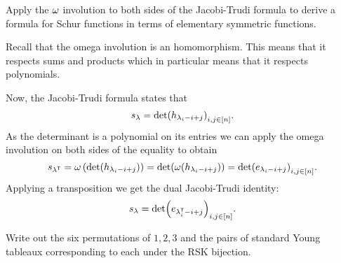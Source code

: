 \documentclass[12pt]{memoir}
\begin{document}
\begin{Ej}[Exercise 2]
    Apply the $\omega$ involution to both sides of the Jacobi-Trudi formula to derive a formula
for Schur functions in terms of elementary symmetric functions.
\end{Ej}

\begin{ptcbr}
    Recall that the omega involution is an homomorphism. This means that it respects sums and products which in particular means that it respects polynomials.\par 
    Now, the Jacobi-Trudi formula states that 
    $$s_\lambda=\det(h_{\lambda_i-i+j})_{i,j\in[n]}.$$
    As the determinant is a polynomial on its entries we can apply the omega involution on both sides of the equality to obtain 
    $$s_{\lambda^{\mathsf{T}}}=\omega\left(\det(h_{\lambda_i-i+j})\right)=\det(\omega(h_{\lambda_i-i+j}))=\det(e_{\lambda_i-i+j})_{i,j\in[n]}.$$
    Applying a transposition we get the dual Jacobi-Trudi identity:
    $$s_{\lambda}=\det(e_{\lambda^{\mathsf{T}}_i-i+j})_{i,j\in[n]}.$$
\end{ptcbr}

\begin{Ej}[Exercise 3]
    Write out the six permutations of $1, 2, 3$ and the pairs of standard Young tableaux corresponding to each under the RSK bijection.
\end{Ej}
\end{document}
